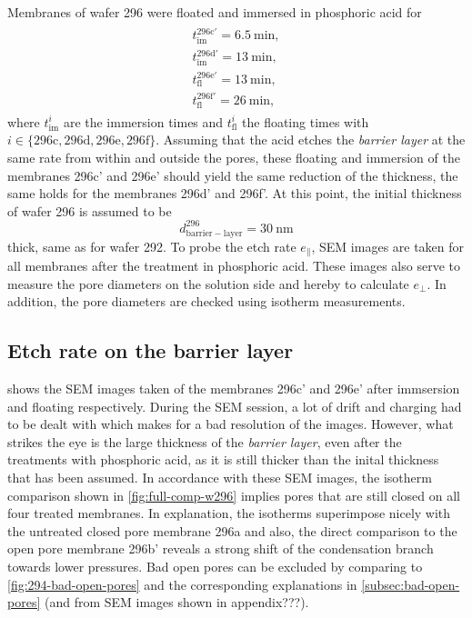 \documentclass[../thesis.tex]{subfiles}
\begin{document}
        Membranes of wafer 296 were floated and immersed in phosphoric acid for
        \begin{align*}
            \begin{split}
                t_\mathrm{im}^\mathrm{296c'}=\SI{6,5}{\minute}, \\
                t_\mathrm{im}^\mathrm{296d'}=\SI{13}{\minute},  \\
                t_\mathrm{fl}^\mathrm{296e'}=\SI{13}{\minute}, \\
                t_\mathrm{fl}^\mathrm{296f'}=\SI{26}{\minute},
            \end{split}
        \end{align*}
        where $t_\mathrm{im}^{i}$ are the immersion times and $t_\mathrm{fl}^{i}$ the floating times with $i\in \{ \mathrm{296c,296d,296e,296f}\}$. Assuming that the acid etches the \textit{barrier layer} at the same rate from within and outside the pores, these floating and immersion of the membranes 296c' and 296e' should yield the same reduction of the thickness, the same holds for the membranes 296d' and 296f'. At this point, the initial thickness of wafer 296 is assumed to be
        \begin{equation*}
          d_\mathrm{barrier-layer}^\mathrm{296} =\SI{30}{\nano\meter}
        \end{equation*}
        thick, same as for wafer 292. To probe the etch rate $e_\parallel$, SEM images are taken for all membranes after the treatment in phosphoric acid. These images also serve to measure the pore diameters on the solution side and hereby to calculate $e_\perp$. In addition, the pore diameters are checked using isotherm measurements.


        \subsection{Etch rate on the barrier layer}
        \label{subsec:etch-rate}

          

           shows the SEM images taken of the membranes 296c' and 296e' after immsersion and floating respectively. During the SEM session, a lot of drift and charging had to be dealt with which makes for a bad resolution of the images. However, what strikes the eye is the large thickness of the \textit{barrier layer}, even after the treatments with phosphoric acid, as it is still thicker than the inital thickness that has been assumed. In accordance with these SEM images, the isotherm comparison shown in \cref{fig:full-comp-w296} implies pores that are still closed on all four treated membranes. In explanation, the isotherms superimpose nicely with the untreated closed pore membrane 296a and also, the direct comparison to the open pore membrane 296b' reveals a strong shift of the condensation branch towards lower pressures. Bad open pores can be excluded by comparing to \cref{fig:294-bad-open-pores} and the corresponding explanations in \cref{subsec:bad-open-pores} (and from SEM images shown in appendix???).
\end{document}
